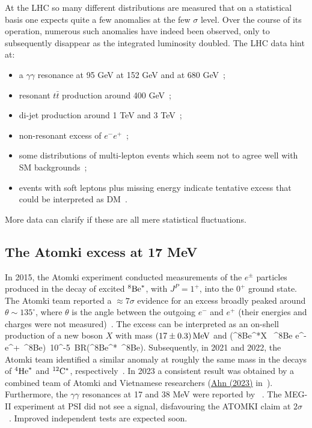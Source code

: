 At the LHC so many different distributions are measured  that on a statistical basis one expects quite a few anomalies at the few $\sigma$ level. 
Over the course of its operation, numerous such anomalies have indeed been observed, only to subsequently disappear as the integrated luminosity doubled. 
The LHC data hint at:
\begin{itemize}
\item[$\rightsquigarrow$] a $\gamma\gamma$ resonance at 95 GeV
at 152 GeV
and at 680 GeV~\cite{2309.03870};
\item[$\rightsquigarrow$] resonant $t\bar t$ production around 400 GeV~\cite{2309.03870};
\item[$\rightsquigarrow$] di-jet production around 1 TeV and 3 TeV~\cite{2309.03870};
\item[$\rightsquigarrow$] non-resonant excess of $e^-e^+$~\cite{2309.03870};
\item[$\rightsquigarrow$] some distributions of multi-lepton events which seem not to agree well with SM backgrounds~\cite{2309.03870};
\item[$\rightsquigarrow$] events with soft leptons plus missing energy indicate tentative excess that could be interpreted as DM~\cite{2403.14759}.
\end{itemize}
More data can clarify if these are all mere statistical fluctuations.


 
\subsection{The {\sc Atomki} excess at 17 MeV}\label{sec:Atomki}
In 2015, the {\sc Atomki} experiment conducted measurements of the $e^\pm$ particles produced in the decay of
 excited $^8{}{\rm Be}^*$, with $J^P=1^+$, into the $0^+$ ground state.
The {\sc Atomki} team reported a $\approx 7\sigma$ evidence for an excess broadly peaked around $\theta\sim 135^\circ$,
where $\theta$ is the angle between the outgoing $e^-$ and $e^+$ (their energies and charges were not measured)~\cite{Atomki}.
The excess can be interpreted as an on-shell production of a new boson $X$ with mass
$(17\pm0.3)\,{\rm MeV}$ and
(^8{}{\rm Be}^*\to X \, {}^8{}{\rm Be} \to e^- e^+\, {}^8{}{\rm Be})~10^{-5}\,
{\rm BR}(^8{}{\rm Be}^*\to \gamma \, {}^8{}{\rm Be}).\eeq
Subsequently, in 2021 and 2022, the {\sc Atomki} team identified a similar anomaly at roughly the same mass in the decays of $^4{\rm He}^*$ and $^{12}{\rm C}^*$, respectively~\cite{Atomki}. 
In 2023 a consistent result was obtained by a combined team of {\sc Atomki} and Vietnamese researchers (\href{https://indico.cern.ch/event/1258038/contributions/5538280/attachments/2700698/4687589/X17\%20HUS\%20ISMD2023.pdf}{Ahn (2023)} in~\cite{Atomki}).
Furthermore, the $\gamma\gamma$ resonances at 17 and 38 MeV were reported by ~\cite{Atomki}.
The MEG-II experiment at PSI did not see a signal, disfavouring the ATOMKI claim at $2\sigma$~\cite{2411.07994}.
Improved independent tests are expected soon. 


